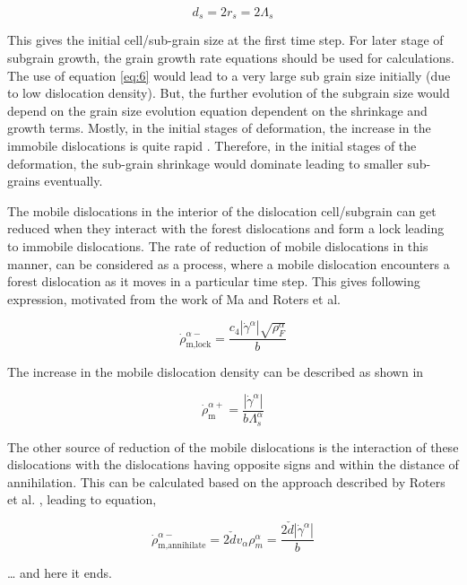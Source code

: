 \documentclass[a4paper,11pt]{article}
\begin{document}
\begin{equation}
d_s = 2r_s = 2\Lambda_s \label{eq:6}
\end{equation}

This gives the initial cell/sub-grain size at the first time step. 
For later stage of subgrain growth, the grain growth rate equations should be used for calculations. 
The use of equation \eqref{eq:6} would lead to a very large sub grain size initially (due to low dislocation density). 
But, the further evolution of the subgrain size would depend on the grain size evolution equation dependent on the shrinkage and growth terms.
Mostly, in the initial stages of deformation, the increase in the immobile dislocations is quite rapid \cite{Roters2000}.
Therefore, in the initial stages of the deformation, the sub-grain shrinkage would dominate leading to smaller sub-grains eventually. 

The mobile dislocations in the interior of the dislocation cell/subgrain can get reduced when they interact with the forest dislocations and form a lock leading to immobile dislocations. 
The rate of reduction of mobile dislocations in this manner, can be considered as a process, where a mobile dislocation encounters a forest dislocation as it moves in a particular time step. 
This gives following expression, motivated from the work of Ma and Roters et al. \cite{Ma2004}

\begin{equation}
\dot\rho_{\text{m,lock}}^{\alpha-} = \frac{c_4\left|\dot\gamma^\alpha\right|\sqrt{\rho_F^\alpha}}{b} \label{eq:7}
\end{equation}

The increase in the mobile dislocation density can be described as shown in \cite{Roters2017}

\begin{equation}
\dot\rho_{\text{m}}^{\alpha+} = \frac{\left|\dot\gamma^\alpha\right|}{b\Lambda_s^\alpha} \label{eq:8}
\end{equation}

The other source of reduction of the mobile dislocations is the interaction of these dislocations with the dislocations having opposite signs and within the distance of annihilation. 
This can be calculated based on the approach described by Roters et al. \cite{Roters2000}, leading to equation,

\begin{equation}
\dot\rho_{\text{m,annihilate}}^{\alpha-} = 2\check{d} v_\alpha \rho_m^\alpha = \frac{2\check{d}\left|\dot\gamma^\alpha\right|}{b} \label{eq:9}
\end{equation}


\ldots{} and here it ends.


\end{document}
